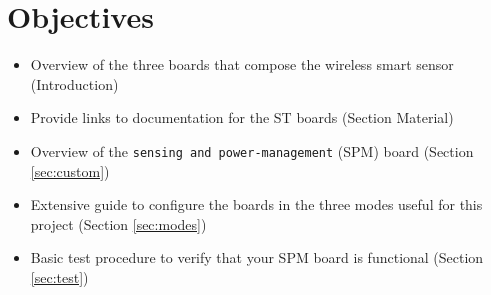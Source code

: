 \clearpage
\section*{Objectives}

\begin{itemize}
    \item Overview of the three boards that compose the wireless smart sensor (Introduction)
    \item Provide links to documentation for the ST boards (Section Material)
    \item Overview of the \texttt{sensing and power-management} (SPM) board (Section \ref{sec:custom})
    \item Extensive guide to configure the boards in the three modes useful for this project (Section \ref{sec:modes})
    \item Basic test procedure to verify that your SPM board is functional (Section \ref{sec:test})
\end{itemize}
